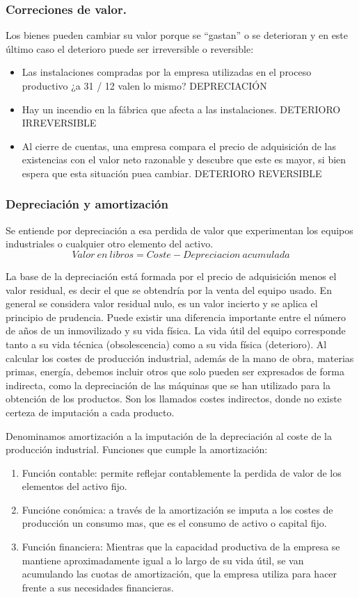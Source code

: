 \subsubsection{Correciones de valor.}
Los bienes pueden cambiar su valor porque se ``gastan'' o se deterioran y en este último caso el deterioro puede ser irreversible o reversible:
\begin{itemize}
    \item Las instalaciones compradas por la empresa utilizadas en el proceso productivo ¿a 31 / 12 valen lo mismo? DEPRECIACIÓN
    \item Hay un incendio en la fábrica que afecta a las instalaciones. DETERIORO IRREVERSIBLE
    \item Al cierre de cuentas, una empresa compara el precio de adquisición de las existencias con el valor neto razonable y descubre que este es mayor, si bien espera que esta situación puea cambiar.  DETERIORO REVERSIBLE
\end{itemize}

\subsubsection{Depreciación y amortización}
Se entiende por depreciación a esa perdida de valor que experimentan los equipos industriales o cualquier otro elemento del activo.
\[ Valor\ en\ libros = Coste - Depreciacion\ acumulada \]

La base de la depreciación está formada por el precio de adquisición menos el valor residual, es decir el que se obtendría por la venta del equipo usado. En general se considera valor residual nulo, es un valor incierto y se aplica el principio de prudencia. Puede existir una diferencia importante entre el número de años de un inmovilizado y su vida física. La vida útil del equipo corresponde tanto a su vida técnica (obsolescencia) como a su vida física (deterioro). Al calcular los costes de producción industrial, además de la mano de obra, materias primas, energía, debemos incluir otros que solo pueden ser expresados de forma indirecta, como la depreciación de las máquinas que se han utilizado para la obtención de los productos. Son los llamados costes indirectos, donde no existe certeza de imputación a cada producto.

Denominamos amortización a la imputación de la depreciación al coste de la producción industrial. Funciones que cumple la amortización:
\begin{enumerate}
    \item Función contable: permite reflejar contablemente la perdida de valor de los elementos del activo fijo.
    \item Funcióne conómica: a través de la amortización se imputa a los costes de producción un consumo mas, que es el consumo de activo o capital fijo.
    \item Función financiera: Mientras que la capacidad productiva de la empresa se mantiene aproximadamente igual a lo largo de su vida útil, se van acumulando las cuotas de amortización, que la empresa utiliza para hacer frente a sus necesidades financieras.
\end{enumerate}

